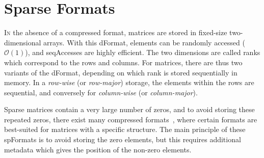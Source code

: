
\section{Sparse Formats}
\label{sec:bg:sparse_formats}

\lettrine{I}{n} the absence of a compressed format, matrices are stored in fixed-size two-dimensional arrays.
With this \gls{dFormat}, elements can be randomly accessed ($\mathcal{O}(1)$), and \gls{seqAccesses} are highly efficient.
The two dimensions are called \glspl{rank} which correspond to the rows and columns.
For matrices, there are thus two variants of the \gls{dFormat}, depending on which \gls{rank} is stored sequentially in memory.
In a \emph{row-wise} (or \emph{row-major}) storage, the elements within the rows are sequential, and conversely for \emph{column-wise} (or \emph{column-major}). 

Sparse matrices contain a very large number of zeros, and to avoid storing these repeated zeros, there exist many compressed formats~\cite{Tewarson1973_COO_CSR_LIL_first, Kincaid1989_ELLPACK, Barrett1994_CSR_BCSR_DIA_ELL, Saad2003_COO_CSR_DIA_ELL, Bell2009_HYB, Chou2018_COO_CSR_DIA_ELL_HASH}, where certain formats are best-suited for matrices with a specific structure.
The main principle of these \glspl{spFormat} is to avoid storing the zero elements, but this requires additional \gls{metadata} which gives the position of the non-zero elements.

